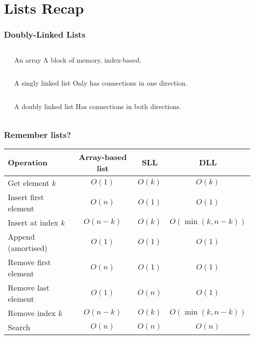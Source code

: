 \section{Lists Recap}
\label{sec:lists_recap}

\begin{frame}
	\frametitle{Doubly-Linked Lists}
		\begin{columns}
		\begin{center}
			
		\end{center}
			\begin{block}{An array}
				A block of memory, index-based.
			\end{block}	
		\end{columns}
		\pause
		\begin{columns}
			\column{0.655\textwidth}
		\begin{center}
			
		\end{center}
			\column{0.355\textwidth}
			\begin{block}{A singly linked list}
				Only has connections in one direction.	
			\end{block}	
		\end{columns}
		\pause
		\begin{columns}
				
			\begin{center}
				
			\end{center}
			\begin{block}{A doubly linked list}
				Has connections in both directions.
			\end{block}
				
		\end{columns}
\end{frame}

\begin{frame}
	\frametitle{Remember lists?}
	
	\begin{tabular}{l | c | c | c}
	Operation & Array-based list & SLL & DLL \\	
	\midrule
	Get element $k$ & $O(1)$ &$O(k)$ & $O(k)$ \\
	Insert first element& $O(n)$ & $O(1)$ & $O(1)$\\
	Insert at index $k$& $O(n-k)$ & $O(k)$ & $O(\min(k,n-k))$\\
	Append (amortised)& $O(1)$ & $O(1)$ & $O(1)$\\
	Remove first element& $O(n)$ & $O(1)$ & $O(1)$\\
	Remove last element& $O(1)$ & $O(n)$ & $O(1)$\\
	Remove index $k$& $O(n-k)$ & $O(k)$ & $O(\min(k,n-k))$\\
	Search & $O(n)$ & $O(n)$ & $O(n)$\\
	\end{tabular}

\end{frame}
